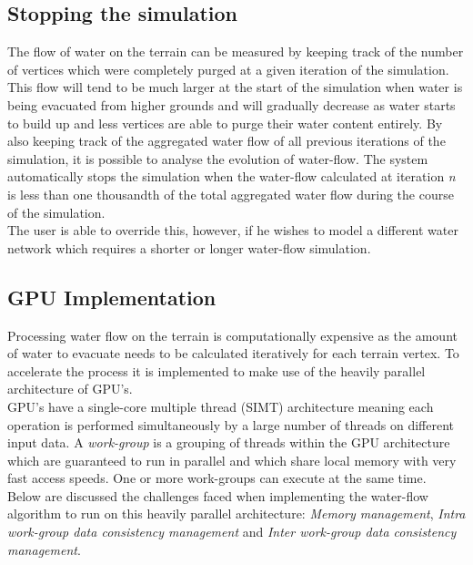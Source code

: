 \subsection{Stopping the simulation} \label{subsec:stopping_water_flow}

The flow of water on the terrain can be measured by keeping track of the number of vertices which were completely purged at a given iteration of the simulation. This flow will tend to be much larger at the start of the simulation when water is being evacuated from higher grounds and will gradually decrease as water starts to build up and less vertices are able to purge their water content entirely. By also keeping track of the aggregated water flow of all previous iterations of the simulation, it is possible to analyse the evolution of water-flow. The system automatically stops the simulation when the water-flow calculated at iteration \textit{n} is less than one thousandth of the total aggregated water flow during the course of the simulation. \\

The user is able to override this, however, if he wishes to model a different water network which requires a shorter or longer water-flow simulation. 

\subsection{GPU Implementation}

Processing water flow on the terrain is computationally expensive as the amount of water to evacuate needs to be calculated iteratively for each terrain vertex. To accelerate the process it is implemented to make use of the heavily parallel architecture of GPU's. \\

GPU's have a single-core multiple thread (SIMT) architecture meaning each operation is performed simultaneously by a large number of threads on different input data. A \textit{work-group} is a grouping of threads within the GPU architecture which are guaranteed to run in parallel and which share local memory with very fast access speeds. One or more work-groups can execute at the same time.\\

Below are discussed the challenges faced when implementing the water-flow algorithm to run on this heavily parallel architecture: \textit{Memory management}, \textit{Intra work-group data consistency management} and \textit{Inter work-group data consistency management}. 

